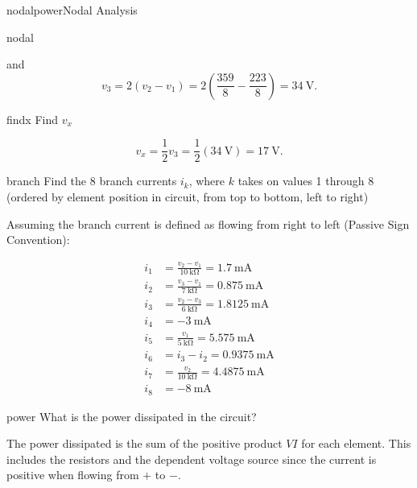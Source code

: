 \begin{mainquestion}{nodalpower}{Nodal Analysis}
\begin{partquestion}{nodal}
\begin{answer}
and
\[
v_3
=
2(v_2 - v_1)
=
2\left(\frac{359}{8} - \frac{223}{8}\right)
=
\qty{34}{\volt}.
\]
\end{answer}
\end{partquestion}

\begin{partquestion}{findx}
{Find $v_x$}

\begin{answer}
\[
v_x = \frac{1}{2}v_3
= \frac{1}{2}\left(\qty{34}{\volt}\right)
= \qty{17}{\volt}.
\]
\end{answer}
\end{partquestion}

\begin{partquestion}{branch}
{Find the 8 branch currents $i_k$, where $k$ takes on values 1 through 8 (ordered by element position in circuit, from top to bottom, left to right)}

\begin{answer}
Assuming the branch current is defined as flowing from right to left (Passive Sign Convention):

\begin{align}
i_1 &= \frac{v_2 - v_1}{\qty{10}{\kilo\ohm}} = \qty{1.7}{\milli\ampere} \\
i_2 &= \frac{v_3 - v_1}{\qty{7}{\kilo\ohm}} = \qty{0.875}{\milli\ampere} \\
i_3 &= \frac{v_2 - v_3}{\qty{6}{\kilo\ohm}} = \qty{1.8125}{\milli\ampere} \\
i_4 &= \qty{-3}{\milli\ampere} \\
i_5 &= \frac{v_1}{\qty{5}{\kilo\ohm}} = \qty{5.575}{\milli\ampere} \\
i_6 &= i_3 - i_2 = \qty{0.9375}{\milli\ampere} \\
i_7 &= \frac{v_2}{\qty{10}{\kilo\ohm}} = \qty{4.4875}{\milli\ampere} \\
i_8 &= \qty{-8}{\milli\ampere}
\end{align}
\end{answer}
\end{partquestion}

\begin{partquestion}{power}
{What is the power dissipated in the circuit?}

\begin{answer}
The power dissipated is the sum of the positive product $VI$ for each element. This includes the resistors and the dependent voltage source since the current is positive when flowing from $+$ to $-$.


\end{answer}
\end{partquestion}
\end{mainquestion}
